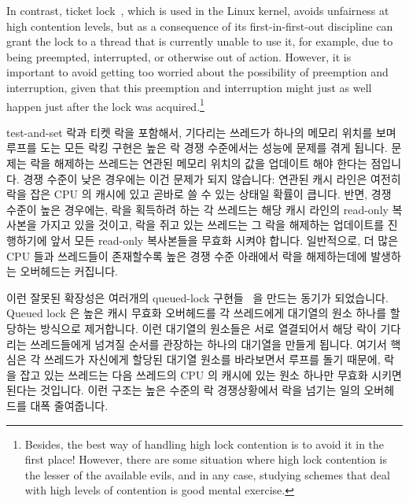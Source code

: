 In contrast, ticket lock~\cite{MellorCrummey91a}, which is used in the Linux
kernel, avoids unfairness at high contention levels, but as a
consequence of its first-in-first-out discipline can grant the
lock to a thread that is currently unable to use it, for example,
due to being preempted, interrupted, or otherwise out of action.
However, it is important to avoid getting too worried about the
possibility of preemption and interruption, given that this preemption
and interruption might just as well happen just after the lock was
acquired.\footnote{
	Besides, the best way of handling high lock contention is to avoid
	it in the first place!
	However, there are some situation where high lock contention
	is the lesser of the available evils, and in any case, studying
	schemes that deal with high levels of contention is good mental
	exercise.}
\fi

test-and-set 락과 티켓 락을 포함해서, 기다리는 쓰레드가 하나의 메모리 위치를
보며 루프를 도는 모든 락킹 구현은 높은 락 경쟁 수준에서는 성능에 문제를 겪게
됩니다.
문제는 락을 해제하는 쓰레드는 연관된 메모리 위치의 값을 업데이트 해야 한다는
점입니다.
경쟁 수준이 낮은 경우에는 이건 문제가 되지 않습니다: 연관된 캐시 라인은 여전히
락을 잡은 CPU 의 캐시에 있고 곧바로 쓸 수 있는 상태일 확률이 큽니다.
반면, 경쟁 수준이 높은 경우에는, 락을 획득하려 하는 각 쓰레드는 해당 캐시
라인의 read-only 복사본을 가지고 있을 것이고, 락을 쥐고 있는 쓰레드는 그 락을
해제하는 업데이트를 진행하기에 앞서 모든 read-only 복사본들을 무효화 시켜야
합니다.
일반적으로, 더 많은 CPU 들과 쓰레드들이 존재할수록 높은 경쟁 수준 아래에서 락을
해제하는데에 발생하는 오버헤드는 커집니다.

이런 잘못된 확장성은 여러개의 queued-lock
구현들~\cite{Anderson90,Graunke90,MellorCrummey91a,Wisniewski94,Craig93,Magnusson94,Takada93}
을 만드는 동기가 되었습니다.
Queued lock 은 높은 캐시 무효화 오버헤드를 각 쓰레드에게 대기열의 원소 하나를
할당하는 방식으로 제거합니다.
이런 대기열의 원소들은 서로 열결되어서 해당 락이 기다리는 쓰레드들에게 넘겨질
순서를 관장하는 하나의 대기열을 만들게 됩니다.
여기서 핵심은 각 쓰레드가 자신에게 할당된 대기열 원소를 바라보면서 루프를 돌기
때문에, 락을 잡고 있는 쓰레드는 다음 쓰레드의 CPU 의 캐시에 있는 원소 하나만
무효화 시키면 된다는 것입니다.
이런 구조는 높은 수준의 락 경쟁상황에서 락을 넘기는 일의 오버헤드를 대폭
줄여줍니다.
\iffalse

